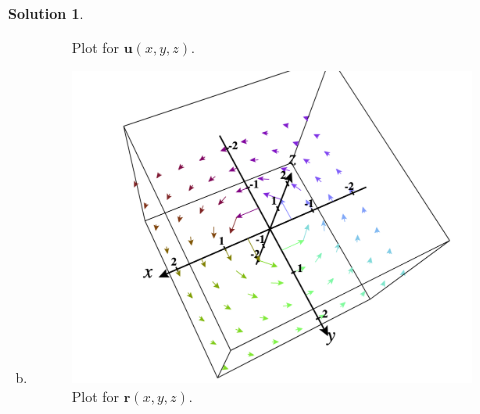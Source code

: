 \documentclass[12pt]{report} %
\theoremstyle{definition}
\newtheorem{solution}{Solution}
\begin{document}
\begin{solution}
\begin{enumerate}[(a)]
\begin{figure}[H]
        \caption{Plot for $\mathbf{u}(x,y,z)$.}
    \end{figure}
    \item 
    \begin{figure}[H]
        \centering
        \includegraphics[width=.6\textwidth]{Images/5d.png}
        \caption{Plot for $\mathbf{r}(x,y,z)$.}
    \end{figure}
\end{enumerate}
\end{solution}
\end{document}
